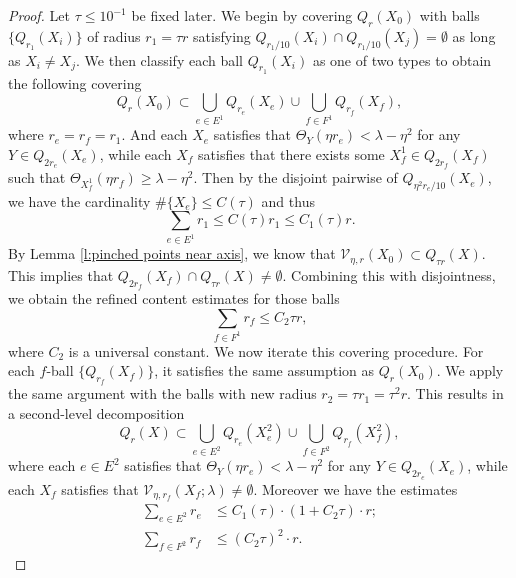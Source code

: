 \documentclass[11pt,reqno]{amsart}
\numberwithin{equation}{section}
\newcommand{\cV}{\mathcal{V}}
\theoremstyle{definition}
\theoremstyle{remark}
\theoremstyle{remark}
\theoremstyle{remark}
\theoremstyle{remark}\newtheorem{conjecture}[equation]{Conjecture}
\theoremstyle{remark}\newtheorem{question}[equation]{Question}
\begin{document}
\begin{proof}
  Let $\tau\le 10^{-1}$ be fixed later. We begin by covering $Q_r(X_0)$ with balls $\{Q_{r_1}(X_i)\}$ of radius $r_1 =  \tau r$ satisfying $Q_{r_1/10}(X_i) \cap Q_{r_1/10}(X_j) = \emptyset$ as long as $X_i \neq X_j$. We then classify each ball $Q_{r_1}(X_i)$ as one of two types to obtain the following covering
    \begin{equation*}
        Q_r(X_0) \subset \bigcup_{e\in E^1} Q_{r_e}(X_e) \cup \bigcup_{f \in F^1} Q_{r_f}(X_f),
    \end{equation*}
where $r_e = r_f= r_1$. And each $X_e$ satisfies that $\Theta_Y(\eta r_e) < \lambda - \eta^2$ for any $Y \in Q_{2r_e}(X_e)$, while each $X_f$ satisfies that there exists some $X^1_f \in Q_{2r_f}(X_f)$ such that $\Theta_{X^1_f}(\eta r_f) \ge \lambda - \eta^2$. Then by the disjoint pairwise of $Q_{\eta^2 r_e/10}(X_e)$, we have the cardinality $\#\{X_e\}\le C(\tau)$ and thus
\begin{equation*}
    \sum_{e\in E^1} r_1 \le C(\tau) r_1\le C_1(\tau) r. 
\end{equation*}
By Lemma \ref{l:pinched points near axis}, we know that $\cV_{\eta,r}(X_0) \subset Q_{\tau r}(X)$. This implies that $Q_{2r_f}(X_f) \cap Q_{\tau r}(X) \neq \emptyset$. Combining this with disjointness, we obtain the refined content estimates for those balls
\begin{equation*}
    \sum_{f  \in F^1} r_f \le C_2 \tau r,
\end{equation*}
where $C_2$ is a universal constant. 
We now iterate this covering procedure. For each $f$-ball $\{Q_{r_f}(X_f)\}$, it satisfies the same assumption as $Q_{r}(X_0)$. We apply the same argument with the balls with new radius $r_2 = \tau r_1 = \tau^2 r$. This results in a second-level decomposition
\begin{equation*}
        Q_r(X) \subset  \bigcup_{e \in E^2} Q_{r_e}(X^2_e) \cup \bigcup_{f \in F^2}Q_{r_f}(X_f^2),
\end{equation*}
where each $e \in E^2$ satisfies that $\Theta_Y(\eta r_e) < \lambda - \eta^2$ for any $Y \in Q_{2r_e}(X_e)$, while each $X_f$ satisfies that $\cV_{\eta,r_f}(X_f;\lambda) \neq \emptyset$. Moreover we have the estimates
\begin{equation*}
\begin{split}
    \sum_{e \in E^2} r_e &\le  C_1(\tau) \cdot( 1+ C_2 \tau) \cdot r ;\\ 
    \sum_{f \in F^2} r_f &\le (C_2 \tau)^2 \cdot r.
\end{split}
\end{equation*}


\end{proof}
\end{document}
